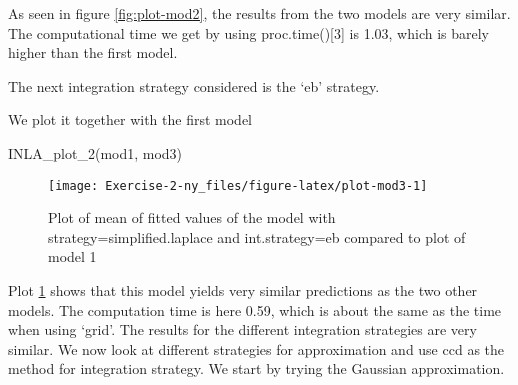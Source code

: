 \documentclass[
]{article}
\newenvironment{Shaded}{\begin{snugshade}}{\end{snugshade}}
\newcommand{\AttributeTok}[1]{\textcolor[rgb]{0.77,0.63,0.00}{#1}}
\newcommand{\CommentTok}[1]{\textcolor[rgb]{0.56,0.35,0.01}{\textit{#1}}}
\newcommand{\FunctionTok}[1]{\textcolor[rgb]{0.00,0.00,0.00}{#1}}
\newcommand{\NormalTok}[1]{#1}
\newcommand{\OtherTok}[1]{\textcolor[rgb]{0.56,0.35,0.01}{#1}}
\newcommand{\SpecialCharTok}[1]{\textcolor[rgb]{0.00,0.00,0.00}{#1}}
\newcommand{\StringTok}[1]{\textcolor[rgb]{0.31,0.60,0.02}{#1}}
\begin{document}
As seen in figure \ref{fig:plot-mod2}, the results from the two models are very similar. The computational time we get by using proc.time(){[}3{]} is 1.03, which is barely higher than the first model.

The next integration strategy considered is the `eb' strategy.

\begin{Shaded}
\end{Shaded}

We plot it together with the first model

\begin{Shaded}
\begin{Highlighting}[]
\FunctionTok{INLA\_plot\_2}\NormalTok{(mod1, mod3)}
\end{Highlighting}
\end{Shaded}

\begin{figure}

{\centering \texttt{[image: Exercise-2-ny\_files/figure-latex/plot-mod3-1]} 

}

\caption{Plot of mean of fitted values of the model with strategy=simplified.laplace and int.strategy=eb compared to plot of model 1}\label{fig:plot-mod3}
\end{figure}

Plot \ref{fig:plot-mod3} shows that this model yields very similar predictions as the two other models.
The computation time is here 0.59, which is about the same as the time when using `grid'. The results for the different integration strategies are very similar. We now look at different strategies for approximation and use ccd as the method for integration strategy. We start by trying the Gaussian approximation.

\begin{Shaded}
\end{Shaded}
\end{document}
